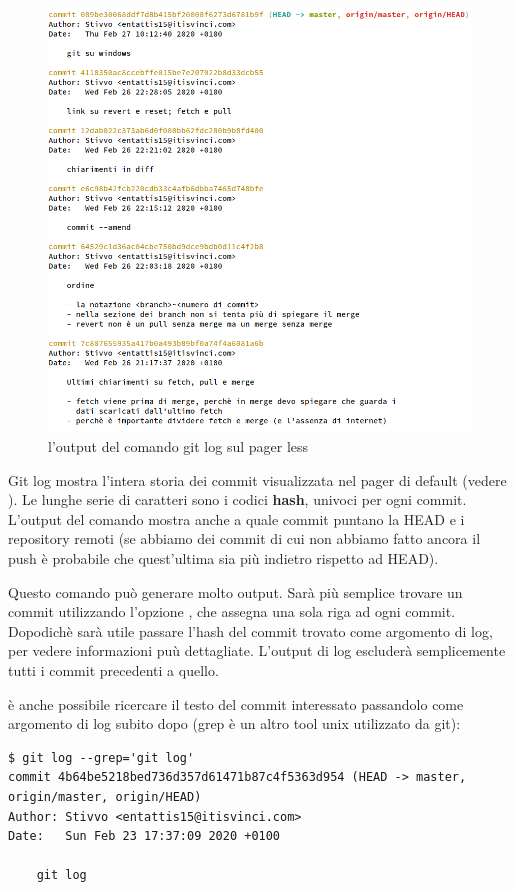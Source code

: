 \documentclass{article}
\begin{document}
\begin{figure}
\includegraphics[width=6in]{img/logOutput.png}
\centering
\caption{l'output del comando git log sul pager less}
\end{figure}

Git log mostra l'intera storia dei commit visualizzata nel pager di default
(vedere ).
Le lunghe serie di caratteri sono i codici \textbf{hash}, univoci per ogni
commit. L'output del comando mostra anche a quale commit puntano la HEAD e i
repository remoti (se abbiamo dei commit di cui non abbiamo fatto ancora il push
è probabile che quest'ultima sia più indietro rispetto ad HEAD).

Questo comando può generare molto output. Sarà più semplice trovare un commit
utilizzando l'opzione , che assegna una sola
riga ad ogni commit. Dopodichè sarà utile passare l'hash del commit trovato come
argomento di log, per vedere informazioni puù dettagliate. L'output di log
escluderà semplicemente tutti i commit precedenti a quello.

è anche possibile ricercare il testo del commit interessato passandolo come
argomento di log subito dopo  (grep è un altro tool unix
utilizzato da git):

\begin{verbatim}
$ git log --grep='git log'
commit 4b64be5218bed736d357d61471b87c4f5363d954 (HEAD -> master, origin/master, origin/HEAD)
Author: Stivvo <entattis15@itisvinci.com>
Date:   Sun Feb 23 17:37:09 2020 +0100

    git log
\end{verbatim}
\end{document}
